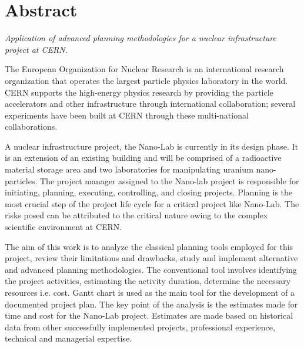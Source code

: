 %
%
%

\chapter*{\huge Abstract}
\begin{SingleSpace}
\emph{Application of advanced planning methodologies for a nuclear infrastructure project at CERN. }
\bigskip


The European Organization for Nuclear Research is an international research organization that operates the largest particle physics laboratory in the world. CERN supports the high-energy physics research by providing the particle accelerators and other infrastructure through international collaboration; several experiments have been built at CERN through these multi-national collaborations.

A nuclear infrastructure project, the Nano-Lab is currently in its design phase. It is an extension of an existing building and will be comprised of a radioactive material storage area and two laboratories for manipulating uranium nano-particles. The project manager assigned to the Nano-lab project is responsible for initiating, planning, executing, controlling, and closing projects. Planning is the most crucial step of the project life cycle for a critical project like Nano-Lab. The risks posed can be attributed to the critical nature owing to the complex scientific environment at CERN.

The aim of this work is to analyze the classical planning tools employed for this project, review their limitations and drawbacks, study and implement alternative and advanced planning methodologies. The conventional tool involves identifying the project activities, estimating the activity duration, determine the necessary resources i.e. cost. Gantt chart is used as the main tool for the development of a documented project plan. The key point of the analysis is the estimates made for time and cost for the Nano-Lab project. Estimates are made based on historical data from other successfully implemented projects, professional experience, technical and managerial expertise.


\end{SingleSpace}
